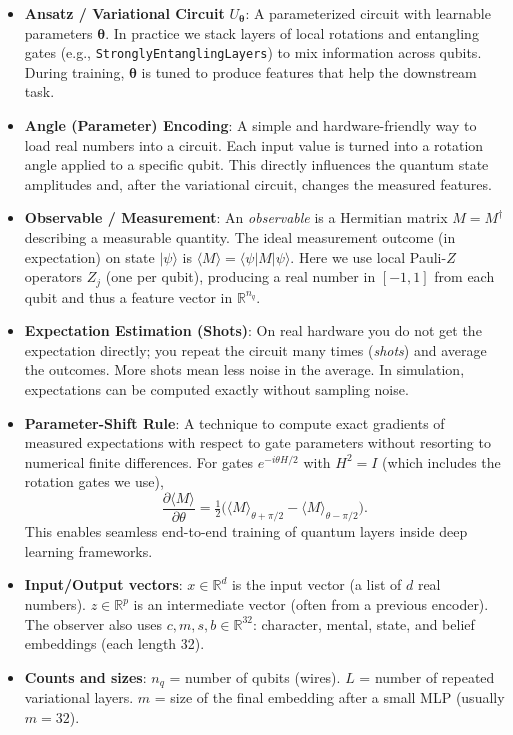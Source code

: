\documentclass[11pt]{article}
\begin{document}
\begin{itemize}
  \item \textbf{Ansatz / Variational Circuit} $U_{\bm{\theta}}$: A parameterized circuit with learnable parameters $\bm{\theta}$. In practice we stack layers of local rotations and entangling gates (e.g., \texttt{StronglyEntanglingLayers}) to mix information across qubits. During training, $\bm{\theta}$ is tuned to produce features that help the downstream task.
  \item \textbf{Angle (Parameter) Encoding}: A simple and hardware-friendly way to load real numbers into a circuit. Each input value is turned into a rotation angle applied to a specific qubit. This directly influences the quantum state amplitudes and, after the variational circuit, changes the measured features.
  \item \textbf{Observable / Measurement}: An \emph{observable} is a Hermitian matrix $M=M^\dagger$ describing a measurable quantity. The ideal measurement outcome (in expectation) on state $|\psi\rangle$ is $\langle M \rangle = \langle\psi|M|\psi\rangle$. Here we use local Pauli-$Z$ operators $Z_j$ (one per qubit), producing a real number in $[-1,1]$ from each qubit and thus a feature vector in $\mathbb{R}^{n_q}$.
  \item \textbf{Expectation Estimation (Shots)}: On real hardware you do not get the expectation directly; you repeat the circuit many times (\emph{shots}) and average the outcomes. More shots mean less noise in the average. In simulation, expectations can be computed exactly without sampling noise.
  \item \textbf{Parameter-Shift Rule}: A technique to compute exact gradients of measured expectations with respect to gate parameters without resorting to numerical finite differences. For gates $e^{-i\theta H/2}$ with $H^2=I$ (which includes the rotation gates we use),
  \begin{equation*}
    \frac{\partial \langle M \rangle}{\partial \theta} = \tfrac{1}{2}\Big( \langle M \rangle_{\theta+\pi/2} - \langle M \rangle_{\theta-\pi/2} \Big).
  \end{equation*}
  This enables seamless end-to-end training of quantum layers inside deep learning frameworks.
  \item \textbf{Input/Output vectors}: $x\in\mathbb{R}^d$ is the input vector (a list of $d$ real numbers). $z\in\mathbb{R}^p$ is an intermediate vector (often from a previous encoder). The observer also uses $c,m,s,b\in\mathbb{R}^{32}$: character, mental, state, and belief embeddings (each length 32).
  \item \textbf{Counts and sizes}: $n_q$ = number of qubits (wires). $L$ = number of repeated variational layers. $m$ = size of the final embedding after a small MLP (usually $m=32$).

\end{itemize}
\end{document}
